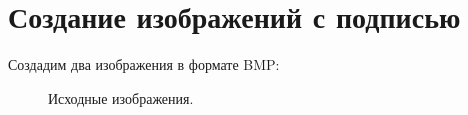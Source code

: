 \documentclass[12pt,a4paper]{scrartcl}
\begin{document}
\section{Создание изображений с подписью}
Создадим два изображения в формате BMP:
\begin{figure}[h]
    \begin{minipage}[h]{0.49\linewidth}
    \end{minipage}
    \hfill
    \begin{minipage}[h]{0.49\linewidth}
    \end{minipage}
    \caption{Исходные изображения.}
    \label{im:1}
\end{figure}
\end{document}
